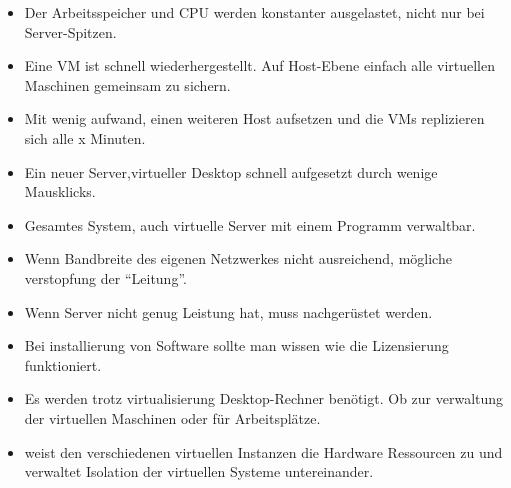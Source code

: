 \documentclass[10pt,a4paper,ragged2e]{altacv}
\begin{document}
  \begin{paracol}{2}

    \begin{itemize}
      \item Der Arbeitsspeicher und CPU werden konstanter ausgelastet, nicht nur bei Server-Spitzen.
      \item Eine VM ist schnell wiederhergestellt. \newline Auf Host-Ebene einfach alle virtuellen Maschinen \newline gemeinsam zu sichern.
      \item Mit wenig aufwand, einen weiteren Host aufsetzen und die VMs replizieren sich alle x Minuten.
      \item Ein neuer Server,virtueller Desktop schnell aufgesetzt durch wenige Mausklicks.
      \item Gesamtes System, auch virtuelle Server mit einem Programm verwaltbar.

    \end{itemize}

    \divider

    \begin{itemize}
      \item Wenn Bandbreite des eigenen Netzwerkes nicht ausreichend, mögliche verstopfung der “Leitung”.
      \item Wenn Server nicht genug Leistung hat, \newline muss nachgerüstet werden.
      \item Bei installierung von Software sollte man wissen wie die Lizensierung funktioniert.
      \item Es werden trotz virtualisierung Desktop-Rechner benötigt. Ob zur verwaltung der virtuellen Maschinen oder für Arbeitsplätze.

    \end{itemize}


    \begin{itemize}
      \item weist den verschiedenen virtuellen Instanzen die Hardware Ressourcen zu und verwaltet Isolation der virtuellen Systeme untereinander.
    \end{itemize}


\end{paracol}
\end{document}
